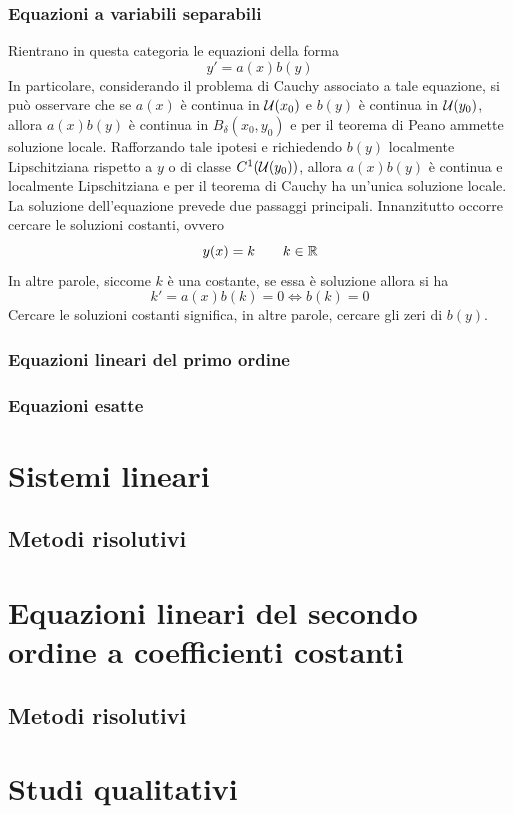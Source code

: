 \subsubsection{Equazioni a variabili separabili}
Rientrano in questa categoria le equazioni della forma
\begin{equation}
    y'=a(x)b(y)
\end{equation}
In particolare, considerando il problema di Cauchy associato a tale equazione, si può osservare che se $a(x)$ è continua in $\mathcal{U}(x_0)$ e $b(y)$ è continua in $\mathcal{U}(y_0)$, allora $a(x)b(y)$ è continua in $B_\delta(x_0, y_0)$ e per il teorema di Peano ammette soluzione locale. Rafforzando tale ipotesi e richiedendo $b(y)$ localmente Lipschitziana rispetto a $y$ o di classe $C^1(\mathcal{U}(y_0))$, allora $a(x)b(y)$ è continua e localmente Lipschitziana e per il teorema di Cauchy ha un'unica soluzione locale.\\
La soluzione dell'equazione prevede due passaggi principali.
Innanzitutto occorre cercare le soluzioni costanti, ovvero
\begin{equation}
    y(x)=k \qquad k \in \mathbb{R}
\end{equation}
In altre parole, siccome $k$ è una costante, se essa è soluzione allora si ha 
\begin{equation}
    k' = a(x)b(k) = 0 \iff b(k)=0
\end{equation}
Cercare le soluzioni costanti significa, in altre parole, cercare gli zeri di $b(y)$.

\subsubsection{Equazioni lineari del primo ordine}

\subsubsection{Equazioni esatte}
\section{Sistemi lineari}
\subsection{Metodi risolutivi}
\section{Equazioni lineari del secondo ordine a coefficienti costanti}
\subsection{Metodi risolutivi}
\section{Studi qualitativi}